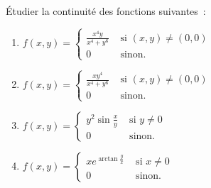 \begin{exercice}[\boringexo]\label{exoLimiteContinue0009}

Étudier la continuité  des  fonctions suivantes~:
\begin{enumerate}
         
\item $f(x,y) = \left\{
         \begin{array}{cc}
         \frac{x^4y}{x^4+y^6} & \mbox{ si }(x,y) \neq (0,0) \\
         0 & \mbox{ sinon. }
         \end{array}
         \right .$

\item $f(x,y) = \left\{
         \begin{array}{cc}
         \frac{xy^4}{x^4+y^6} & \mbox{ si }(x,y) \neq (0,0) \\
         0 & \mbox{ sinon. }
         \end{array}
         \right .$
         
\item $f(x,y) = \left\{
         \begin{array}{cc}
         y^2\sin \frac{x}{y} & \mbox{ si }y \neq 0 \\
         0 & \mbox{ sinon. }
         \end{array}
         \right .$
         
\item $f(x,y) = \left\{
         \begin{array}{cc}
         xe^{\arctan \frac{y}{x}} & \mbox{ si }x \neq 0 \\
         0 & \mbox{ sinon. }
         \end{array}
         \right .$
         
\end{enumerate}


\end{exercice}
